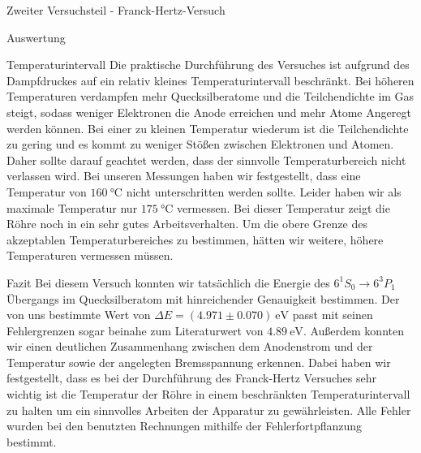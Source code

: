 \documentclass[pdftex, a4paper,11pt, twoside, ngerman]{report}
\begin{document}
\begin{chapter}{Zweiter Versuchsteil - Franck-Hertz-Versuch}
\begin{section}{Auswertung}
      \begin{subsection}{Temperaturintervall}
        \label{chp:FH:sec:AuswertungTemperatur}
        Die praktische Durchführung des Versuches ist aufgrund des Dampfdruckes
        auf ein relativ kleines Temperaturintervall beschränkt. Bei höheren
        Temperaturen verdampfen mehr Quecksilberatome und die Teilchendichte
        im Gas steigt, sodass weniger Elektronen die Anode erreichen und mehr
        Atome Angeregt werden können. Bei einer zu kleinen Temperatur wiederum
        ist die Teilchendichte zu gering und es kommt zu weniger Stößen
        zwischen Elektronen und Atomen. Daher sollte darauf geachtet werden,
        dass der sinnvolle Temperaturbereich nicht verlassen wird. Bei unseren
        Messungen haben wir festgestellt, dass eine Temperatur von 
        $\SI{160}{\celsius}$ nicht unterschritten werden sollte. Leider haben
        wir als maximale Temperatur nur $\SI{175}{\celsius}$ vermessen. Bei
        dieser Temperatur zeigt die Röhre noch in ein sehr gutes
        Arbeitsverhalten. Um die obere Grenze des akzeptablen
        Temperaturbereiches zu bestimmen, hätten wir weitere, höhere
        Temperaturen vermessen müssen.
        
      \end{subsection}
      
    \end{section}
   
   
   
    \begin{section}{Fazit}
      \label{chp:FH:sec:Fazit}
      Bei diesem Versuch konnten wir tatsächlich die Energie des
      $6^{1}S_{0} \rightarrow 6^{3}P_{1}$ Übergangs im Quecksilberatom mit
      hinreichender Genauigkeit bestimmen. Der von uns bestimmte Wert von
      $\Delta E = (4.971\pm 0.070)\SI{}{\electronvolt}$ passt mit seinen
      Fehlergrenzen sogar beinahe zum Literaturwert von 
      $\SI{4.89}{\electronvolt}$. \newline
      Außerdem konnten wir einen deutlichen Zusammenhang zwischen dem
      Anodenstrom und der Temperatur sowie der angelegten Bremsspannung
      erkennen. Dabei haben wir festgestellt, dass es bei der Durchführung des
      Franck-Hertz Versuches sehr wichtig ist die Temperatur der Röhre in einem
      beschränkten Temperaturintervall zu halten um ein sinnvolles Arbeiten
      der Apparatur zu gewährleisten. \newline
      Alle Fehler wurden bei den benutzten Rechnungen mithilfe der
      Fehlerfortpflanzung bestimmt.
    \end{section}
   
  \end{chapter}
  
\end{document}
